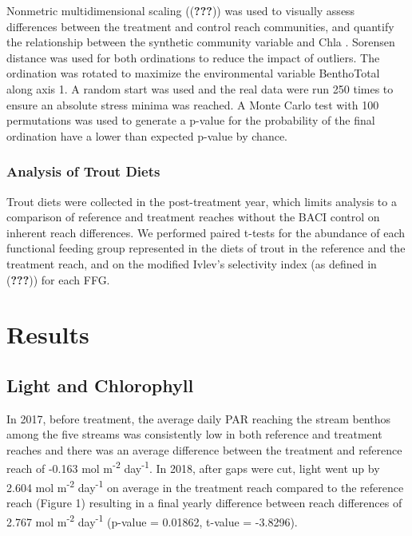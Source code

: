 \documentclass[double,12pt]{beavtex}
\begin{document}
  Nonmetric multidimensional scaling (({\textbf{???}})) was used to
  visually assess differences between the treatment and control reach
  communities, and quantify the relationship between the synthetic
  community variable and Chla . Sorensen distance was used for both
  ordinations to reduce the impact of outliers. The ordination was rotated
  to maximize the environmental variable BenthoTotal along axis 1. A
  random start was used and the real data were run 250 times to ensure an
  absolute stress minima was reached. A Monte Carlo test with 100
  permutations was used to generate a p-value for the probability of the
  final ordination have a lower than expected p-value by chance.
  
  \subsection*{Analysis of Trout Diets}\label{analysis-of-trout-diets}
  
  Trout diets were collected in the post-treatment year, which limits
  analysis to a comparison of reference and treatment reaches without the
  BACI control on inherent reach differences. We performed paired t-tests
  for the abundance of each functional feeding group represented in the
  diets of trout in the reference and the treatment reach, and on the
  modified Ivlev's selectivity index (as defined in ({\textbf{???}})) for
  each FFG.
  
  \chapter*{Results}\label{results}
  
  \section*{Light and Chlorophyll}\label{light-and-chlorophyll}
  
  In 2017, before treatment, the average daily PAR reaching the stream
  benthos among the five streams was consistently low in both reference
  and treatment reaches and there was an average difference between the
  treatment and reference reach of -0.163 mol m\textsuperscript{-2}
  day\textsuperscript{-1}. In 2018, after gaps were cut, light went up by
  2.604 mol m\textsuperscript{-2} day\textsuperscript{-1} on average in
  the treatment reach compared to the reference reach (Figure 1) resulting
  in a final yearly difference between reach differences of 2.767 mol
  m\textsuperscript{-2} day\textsuperscript{-1} (p-value = 0.01862,
  t-value = -3.8296).
  
\end{document}

